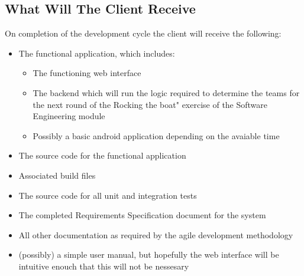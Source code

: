 \subsection{What Will The Client Receive}
On completion of the development cycle the client will receive the following:
\begin{itemize}
	\item The functional application, which includes:
	\begin{itemize}
		\item The functioning web interface
		\item The backend which will run the logic required to determine the teams for the next round of the Rocking the boat" exercise of the Software Engineering module
		\item Possibly a basic android application depending on the avaiable time
	\end{itemize}
	\item The source code for the functional application
	\item Associated build files
	\item The source code for all unit and integration tests
	\item The completed Requirements Specification document for the system
	\item All other documentation as required by the agile development methodology
	\item (possibly) a simple user manual, but hopefully the web interface will be intuitive enouch that this will not be nessesary	
\end{itemize}